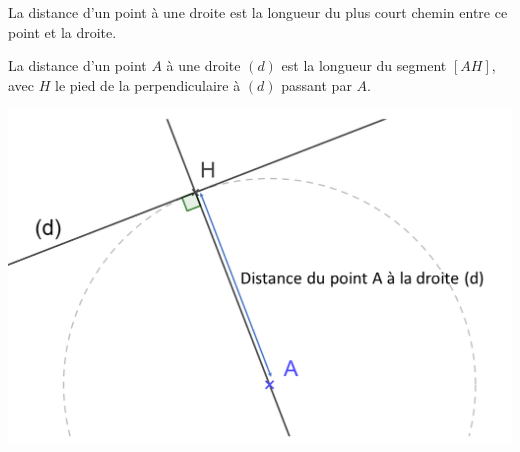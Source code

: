 
 \newpage

\begin{mydef}
	La distance d’un point à une droite est la longueur du plus court chemin entre ce point et la droite.
\end{mydef}

\begin{myprop}
	La distance d’un point $A$ à une droite $(d)$ est la longueur du segment $[AH]$, avec $H$ le pied de la perpendiculaire à $(d)$ passant par $A$.
\end{myprop}

\begin{center}
	\includegraphics[scale=0.5]{img/lgr_droite}
\end{center}